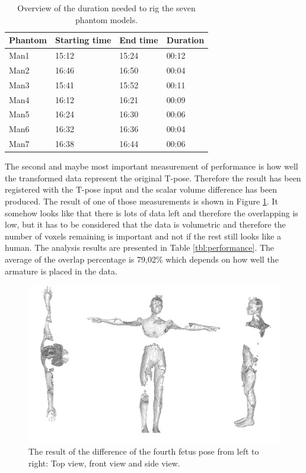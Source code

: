 \begin{table}[!htb]
    \centering
    \begin{tabular}{l|l|l|l}
    Phantom & Starting time & End time & Duration \\ \hline
    Man1    & 15:12         & 15:24    & 00:12    \\ \hline
    Man2    & 16:46         & 16:50    & 00:04    \\ \hline
    Man3    & 15:41         & 15:52    & 00:11    \\ \hline
    Man4    & 16:12         & 16:21    & 00:09    \\ \hline
    Man5    & 16:24         & 16:30    & 00:06    \\ \hline
    Man6    & 16:32         & 16:36    & 00:04    \\ \hline
    Man7    & 16:38         & 16:44    & 00:06   
    \end{tabular}
    \caption{Overview of the duration needed to rig the seven phantom models.}
    \label{tbl:duration}
\end{table}

The second and maybe most important measurement of performance is how well the transformed data represent the original T-pose. Therefore the result has been registered with the T-pose input and the scalar volume difference has been produced. The result of one of those measurements is shown in Figure \ref{fig:differences}. It somehow looks like that there is lots of data left and therefore the overlapping is low, but it has to be considered that the data is volumetric and therefore the number of voxels remaining is important and not if the rest still looks like a human. The analysis results are presented in Table \ref{tbl:performance}. The average of the overlap percentage is \textbf{}{79,02\%} which depends on how well the armature is placed in the data.
 
\begin{figure} [htb!]
	\includegraphics[width=14cm]{content/images/results/man4Differences}
	\caption{The result of the difference of the fourth fetus pose from left to right: Top view, front view and side view.}
	\label{fig:differences}
\end{figure}

